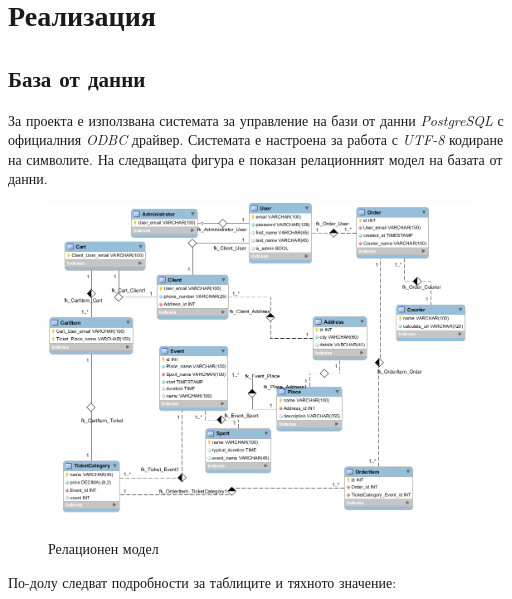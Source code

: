 \documentclass[a4paper,10pt, leqno]{article}
\newcommand{\term}[1] {\textsl{#1}}
\begin{document}
  \section{Реализация}
    \subsection{База от данни}
    За проекта е използвана системата за управление на бази от данни \term{PostgreSQL} с официалния \term{ODBC} драйвер.
    Системата е настроена за работа с \term{UTF-8} кодиране на символите. На следващата фигура е показан релационният
    модел на базата от данни.

    \begin{figure}
      \centering
      \includegraphics[width=15cm]{../database/relational_model.png}
      \label{fig:r}
      \caption{Релационен модел}
    \end{figure}
    
    По-долу следват подробности за таблиците и тяхното значение:
\end{document}
